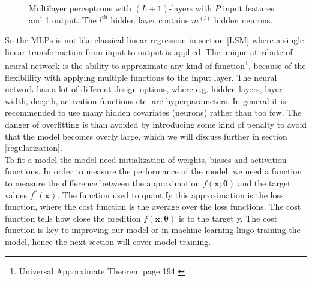 \begin{figure}[th]
	\caption[Multilayer perceptrons with $(L+1)$-layers]{Multilayer perceptrons with $(L+1)$-layers with $P$ input features and 1 output. The $l^{\text{th}}$ hidden layer contains $m^{(l)}$ hidden neurons.}
	\label{fig:multilayer-perceptron}
\end{figure}

So the MLPs is not like classical linear regression in section \ref{LSM} where a single linear transformation from input to output is applied. The unique attribute of neural network is the ability to approximate any kind of function\footnote{Universal Apporximate Theorem page 194 \parencite{Goodfellow-et-al-2016}}, because of the flexiblility with applying multiple functions to the input layer. The neural network has a lot of different design options, where e.g. hidden layers, layer width, deepth, activation functions etc. are hyperparameters. In general it is recommended to use many hidden covariates (neurons) rather than too few. The danger of overfitting is than avoided by introducing some kind of penalty to avoid that the model becomes overly large, which we will discuss further in section \ref{regularization}.\\

To fit a model the model need initialization of weights, biases and activation functions. In order to measure the performance of the model, we need a function to measure the difference between the approximation $f(\bm{x};\bm{\theta})$ and the target values $f^*(\bm{x})$. The function used to quantify this approximation is the loss function, where the cost function is the average over the loss functions. The cost function tells how close the predition $f(\bm{x};\bm{\theta})$ is to the target y. The cost function is key to improving our model or in machine learning lingo training the model, hence the next section will cover model training.

